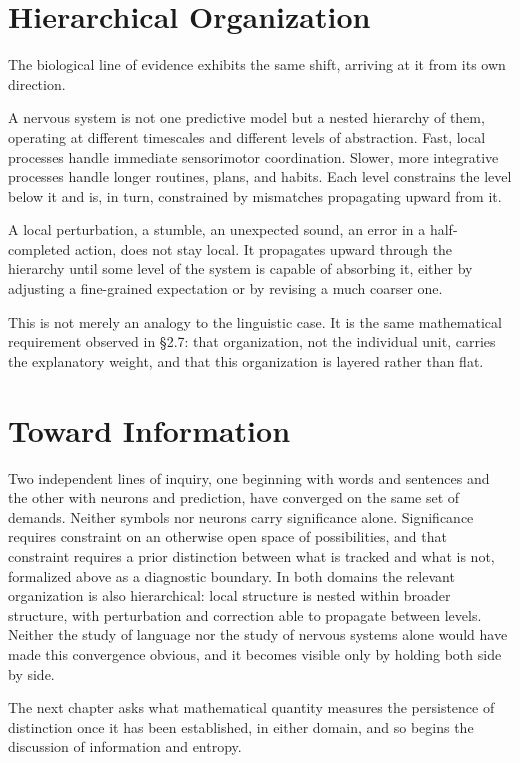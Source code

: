 \documentclass[11pt,oneside]{book}
\numberwithin{equation}{chapter}
\theoremstyle{definition}
\theoremstyle{plain}
\begin{document}
\section{Hierarchical Organization}

The biological line of evidence exhibits the same shift, arriving at it from
its own direction.

A nervous system is not one predictive model but a nested hierarchy of them,
operating at different timescales and different levels of abstraction.
Fast, local processes handle immediate sensorimotor coordination. Slower,
more integrative processes handle longer routines, plans, and habits. Each
level constrains the level below it and is, in turn, constrained by
mismatches propagating upward from it.

A local perturbation, a stumble, an unexpected sound, an error in a
half-completed action, does not stay local. It propagates upward through the
hierarchy until some level of the system is capable of absorbing it, either
by adjusting a fine-grained expectation or by revising a much coarser one.

This is not merely an analogy to the linguistic case. It is the same
mathematical requirement observed in \S 2.7: that organization, not the
individual unit, carries the explanatory weight, and that this organization
is layered rather than flat.

\section{Toward Information}

Two independent lines of inquiry, one beginning with words and sentences and the other with neurons and prediction, have converged on the same set of demands. Neither symbols nor neurons carry significance alone. Significance requires constraint on an otherwise open space of possibilities, and that constraint requires a prior distinction between what is tracked and what is not, formalized above as a diagnostic boundary. In both domains the relevant organization is also hierarchical: local structure is nested within broader structure, with perturbation and correction able to propagate between levels. Neither the study of language nor the study of nervous systems alone would have made this convergence obvious, and it becomes visible only by holding both side by side.

The next chapter asks what mathematical quantity measures the persistence of distinction once it has been established, in either domain, and so begins the discussion of information and entropy.
\end{document}

